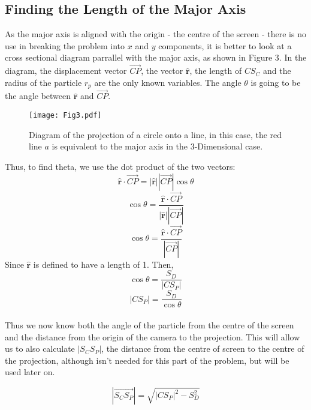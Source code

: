 \documentclass{article}
\newcommand\ddd{{3-Dimensional}\xspace}
\newcommand\ru{\hat{\mathbf{r}}\xspace}
\newcommand\cpv{\overrightarrow{CP}\xspace}
\begin{document}
	\subsection{Finding the Length of the Major Axis}
	As the major axis is aligned with the origin - the centre of the screen - there is no use in breaking the problem into $x$ and $y$ 
	components, it is better to look at a cross sectional diagram parrallel with the major axis, as shown in Figure 3. 
	In the diagram, the displacement vector $\overrightarrow{CP}$, the vector $\hat{\mathbf{r}}$, the length of $CS_C$ and the radius of the 
	particle $r_p$ are the only known variables. The angle $\theta$ is going to be the angle between $\ru$ and $\cpv$. 
	\begin{figure}
		\texttt{[image: Fig3.pdf]}
		\caption{Diagram of the projection of a circle onto a line, in this case, the red line $a$ is equivalent to the major axis in the \ddd case.}
	\end{figure} 
	Thus, to find theta, we use the dot product of the two vectors:
	$$
	\ru \cdot \cpv = |\ru| |\cpv| \cos{\theta} $$ $$
	\cos{\theta} = \frac{\ru \cdot \cpv}{|\ru||\cpv|}
	$$
	\begin{equation}
		\cos{\theta} = \frac{\ru \cdot \cpv}{|\cpv|}
	\end{equation}
	Since $\ru$ is defined to have a length of 1. Then,
	$$\cos{\theta} = \frac{S_D}{|CS_P|} $$
	\begin{equation}
		\left|C S_P\right| = \frac{S_D}{\cos{\theta}}
	\end{equation}
	\paragraph{}
	Thus we now know both the angle of the particle from the centre of the screen and the distance from the origin of the camera to the 
	projection. This will allow us to also calculate $|S_C S_P|$, the distance from the centre of screen to the centre 
	of the projection, although isn't needed for this part of the problem, but will be used later on.

	$$\left| \overrightarrow{S_C S_P} \right| =\sqrt{ \left|C S_P\right|^2 - S_D ^2}$$
\end{document}

